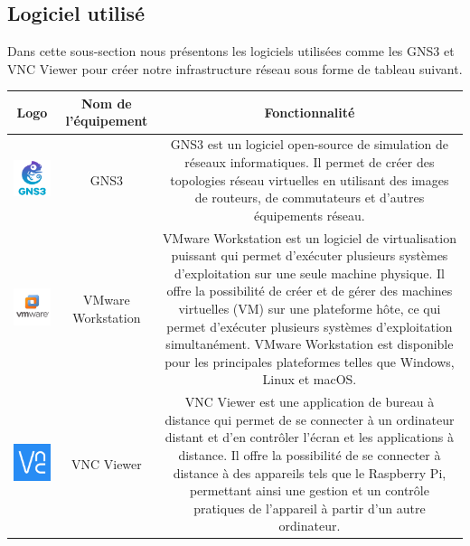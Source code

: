 \subsection{Logiciel utilisé}

Dans cette sous-section nous présentons les logiciels utilisées comme les GNS3 et VNC Viewer pour créer notre infrastructure réseau sous forme de tableau suivant. 


\begin{table}[H]
\begin{center}
\begin{tabular}{|c{3cm}|c{3cm}|c{10cm}|}
\hline
\textbf{Logo}         & \textbf{Nom de l'équipement}   & \textbf{Fonctionnalité} \\
\hline
\includegraphics[width=3cm]{Images/Logo-GNS3.png} & GNS3 & GNS3 est un logiciel open-source de simulation de réseaux informatiques. Il permet de créer des topologies réseau virtuelles en utilisant des images de routeurs, de commutateurs et d'autres équipements réseau. \\
\hline
\includegraphics[width=3cm]{Images/Logo-VMWare.jpg}  & VMware Workstation & VMware Workstation est un logiciel de virtualisation puissant qui permet d'exécuter plusieurs systèmes d'exploitation sur une seule machine physique. Il offre la possibilité de créer et de gérer des machines virtuelles (VM) sur une plateforme hôte, ce qui permet d'exécuter plusieurs systèmes d'exploitation simultanément. VMware Workstation est disponible pour les principales plateformes telles que Windows, Linux et macOS. \\
\hline
\includegraphics[width=3cm]{Images/Logo-VNCViewer.png} & VNC Viewer & VNC Viewer est une application de bureau à distance qui permet de se connecter à un ordinateur distant et d'en contrôler l'écran et les applications à distance. Il offre la possibilité de se connecter à distance à des appareils tels que le Raspberry Pi, permettant ainsi une gestion et un contrôle pratiques de l'appareil à partir d'un autre ordinateur. \\

\end{tabular}
\end{center}
\end{table}
